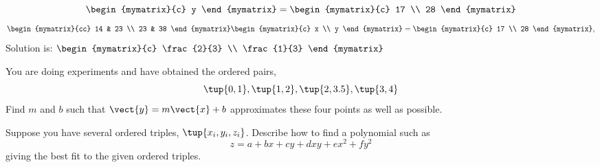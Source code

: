 \begin{enumialphparenastyle}
\begin{ex}
\begin{sol}
\[\begin{mymatrix}{c}
y
\end{mymatrix} =\begin{mymatrix}{c}
17 \\
28
\end{mymatrix}
\]
\[
\begin{mymatrix}{cc}
14 & 23 \\
23 & 38
\end{mymatrix} \begin{mymatrix}{c}
x \\
y
\end{mymatrix} =\begin{mymatrix}{c}
17 \\
28
\end{mymatrix} ,
\]
Solution is: $\begin{mymatrix}{c}
\frac{2}{3} \\
\frac{1}{3}
\end{mymatrix}$
\end{sol}
\end{ex}

\begin{ex}
 You are doing experiments and have obtained the ordered pairs, 
\begin{equation*}
\tup{0,1} ,\tup{1,2} ,\tup{2,3.5} ,\tup{3,4}
\end{equation*}
Find $m$ and $b$ such that $\vect{y}=m\vect{x}+b$ approximates these four points as well
as possible. 
\end{ex}

\begin{ex}
Suppose you have several ordered triples, $\tup{
x_{i},y_{i},z_{i}}$. Describe how to find a polynomial such as  
\begin{equation*}
z=a+bx+cy+dxy+ex^{2}+fy^{2}
\end{equation*}
 giving the best fit to the given ordered triples.
\end{ex}

\end{enumialphparenastyle}